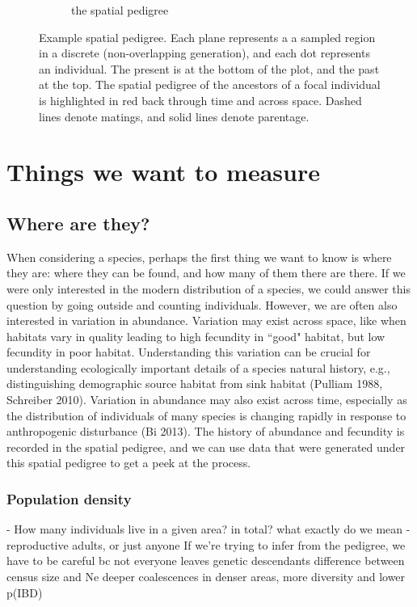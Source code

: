 \documentclass{ar-1col}
\begin{document}
\begin{figure}[h!]
\begin{subfigure}{0.55\textwidth}
		\caption{the spatial pedigree}
		\label{sp_pedigree}
	\end{subfigure}
		\caption{
			Example spatial pedigree.
	        		Each plane represents a a sampled region in a discrete (non-overlapping generation), 
        			and each dot represents an individual.
        			The present is at the bottom of the plot, and the past at the top.
	        		The spatial pedigree of the ancestors of a focal individual is highlighted in red
        			back through time and across space.
        			Dashed lines denote matings, and solid lines denote parentage.
		}
		\label{spatial_pedigree}
\end{figure}


\section{Things we want to measure}
\subsection{Where are they?}
When considering a species, 
perhaps the first thing we want to know is where they are: 
where they can be found, and how many of them there are there.
If we were only interested in the modern distribution of a species, 
we could answer this question by going outside and counting individuals.
However, we are often also interested in variation in abundance.
Variation may exist across space,
like when habitats vary in quality
leading to high fecundity in ``good" habitat, 
but low fecundity in poor habitat.
Understanding this variation can be crucial for understanding 
ecologically important details of a species natural history, 
e.g., distinguishing demographic source habitat from sink habitat (Pulliam 1988, Schreiber 2010).
Variation in abundance may also exist across time,
especially as the distribution of individuals of many species is changing rapidly 
in response to anthropogenic disturbance (Bi 2013).
The history of abundance and fecundity is recorded in the spatial pedigree, 
and we can use data that were generated under this spatial pedigree 
to get a peek at the process.

\subsubsection{Population density}
        - How many individuals live in a given area? in total?
what exactly do we mean - reproductive adults, or just anyone
If we're trying to infer from the pedigree, we have to be careful bc not everyone leaves genetic descendants
difference between census size and Ne
deeper coalescences in denser areas, more diversity and lower p(IBD)
\end{document}
